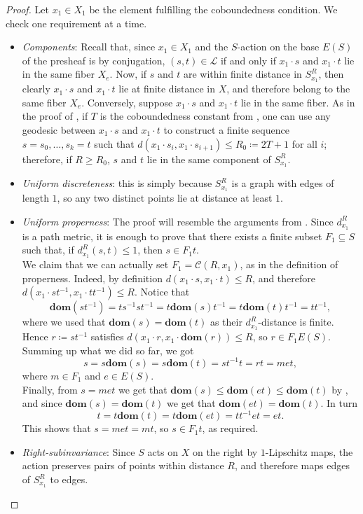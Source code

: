 \documentclass[svgnames]{amsart}
\theoremstyle{plain}
\theoremstyle{definition}
\newcommand{\dom}[1]{\mathbf{dom}\left(#1\right)}
\begin{document}
\begin{proof}
Let $x_1 \in X_1$ be the element fulfilling the coboundedness condition. 
We check one requirement at a time.
\begin{itemize}
    \item \emph{Components}: Recall that, since $x_1\in X_1$ and the $S$-action on the base $E(S)$ of the presheaf is by conjugation, $(s,t)\in\mathcal{L}$ if and only if $x_1\cdot s$ and $x_1\cdot t$ lie in the same fiber $X_e$. Now, if $s$ and $t$ are within finite distance in $S^R_{x_1}$, then clearly $x_1\cdot s$ and $x_1\cdot t$ lie at finite distance in $X$, and therefore belong to the same fiber $X_e$. Conversely, suppose $x_1\cdot s$ and $x_1\cdot t$ lie in the same fiber. As in the proof of , if $T$ is the coboundedness constant from , one can use any geodesic between $x_1\cdot s$ and $x_1\cdot t$ to construct a finite sequence $s=s_0,\ldots, s_k=t$ such that $d(x_1\cdot s_i, x_1\cdot s_{i+1})\leq R_0\coloneq 2T+1$ for all $i$; therefore, if $R\ge R_0$, $s$ and $t$ lie in the same component of $S^R_{x_1}$. 
    
    
    \item \emph{Uniform discreteness}: this is simply because $S^R_{x_1}$ is a graph with edges of length $1$, so any two distinct points lie at distance at least $1$.
    \item \emph{Uniform properness}: The proof will resemble the arguments from . Since $d^R_{x_1}$ is a path metric, it is enough to prove that there exists a finite subset $F_1\subseteq S$ such that, if $d^R_{x_1}(s,t)\le 1$, then $s\in F_1 t$. 
    \\
    We claim that we can actually set $F_1=\mathcal{C}(R,x_1)$, as in the definition of properness. Indeed, by definition $d(x_1\cdot s, x_1\cdot t)\le R$, and therefore $d(x_1\cdot st^{-1}, x_1\cdot tt^{-1})\le R$. Notice that 
    \[
    \dom{st^{-1}}=ts^{-1}st^{-1}=t\dom{s}t^{-1}=t\dom{t}t^{-1}=tt^{-1},
    \]
    where we used that $\dom{s}=\dom{t}$ as their $d^R_{x_1}$-distance is finite. Hence $r\coloneq st^{-1}$ satisfies $d(x_1\cdot r, x_1\cdot \dom{r})\le R$, so $r\in F_1 E(S)$. Summing up what we did so far, we got $$s=s\dom{s}=s\dom{t}=st^{-1}t=rt=met,$$ where $m\in F_1$ and $e\in E(S)$. 
    \\
    Finally, from $s=met$ we get that $\dom{s}\le \dom{et}\le \dom{t}$ by , and since $\dom{s}=\dom{t}$ we get that $\dom{et}=\dom{t}$. In turn 
    $$t=t\dom{t}=t\dom{et}=tt^{-1}et=et.$$
    This shows that $s=met=mt$, so $s\in F_1 t$, as required. 
    \item \emph{Right-subinvariance}: Since $S$ acts on $X$ on the right by $1$-Lipschitz maps, the action preserves pairs of points within distance $R$, and therefore maps edges of $S^R_{x_1}$ to edges.\qedhere 
\end{itemize}
\end{proof}
\end{document}
